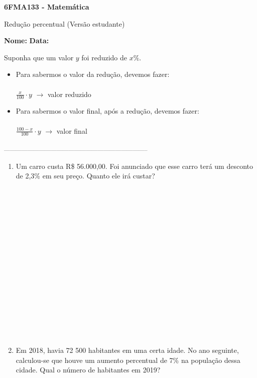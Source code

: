 \documentclass[a4paper,14pt]{article}
\begin{document}
	
	\noindent\textbf{6FMA133 - Matemática} 
	
	\begin{center}Redução percentual (Versão estudante)
	\end{center}
	
	\noindent\textbf{Nome:} \underline{\hspace{10cm}}
	\noindent\textbf{Data:} \underline{\hspace{4cm}}
	
	
	\begin{multicols}{2}
	    \noindent Suponha que um valor $y$ foi reduzido de $x\%$.
	    \begin{itemize}
	    	\item Para sabermos o valor da redução, devemos fazer: \\\\ $\frac{x}{100} \cdot y$ $\longrightarrow$ valor reduzido
	    	\item Para sabermos o valor final, após a redução, devemos fazer: \\\\ $\frac{100 - x}{100} \cdot y$ $\longrightarrow$ valor final
	    \end{itemize}
		\noindent\textsubscript{--------------------------------------------------------------------------}
		\begin{enumerate} 
			\item Um carro custa R\$ 56.000,00. Foi anunciado que esse carro terá um desconto de 2,3\% em seu preço. Quanto ele irá custar? \\\\\\\\\\\\\\\\\\\\\\\\\\\\\\\\\\
			\item Em 2018, havia 72 500 habitantes em uma certa idade. No ano seguinte, calculou-se que houve um aumento percentual de 7\% na população dessa cidade. Qual o número de habitantes em 2019? \\\\\\\\\\\\\\\\\\\\

\end{enumerate}
\end{multicols}
\end{document}
